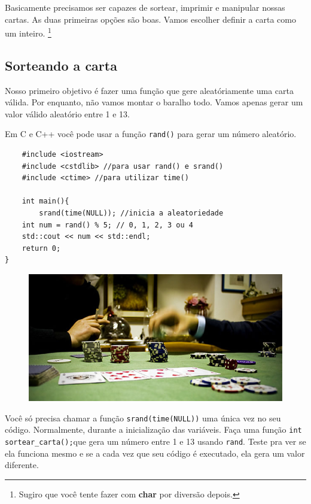 \documentclass[12pt]{article}
\newcommand{\code}[1]{\lstinline|#1|} %
\newcommand{\bold}[1]{\textbf{#1}} %
\begin{document}
Basicamente precisamos ser capazes de sortear, imprimir e manipular nossas
cartas.  As duas primeiras opções são boas. Vamos escolher definir a carta como
um inteiro.  \footnote{Sugiro que você tente fazer com \bold{char} por diversão
depois.}

\subsection{Sorteando a carta}

Nosso primeiro objetivo é fazer uma função que gere aleatóriamente uma carta
válida.  Por enquanto, não vamos montar o baralho todo. Vamos apenas gerar um
valor válido aleatório entre 1 e 13.

Em C e C++ você pode usar a função \code{rand()} para gerar um número aleatório.

\begin{mdframed}[nobreak=true]
	\begin{lstlisting}
	#include <iostream>
	#include <cstdlib> //para usar rand() e srand()
	#include <ctime> //para utilizar time()

	int main(){
		srand(time(NULL)); //inicia a aleatoriedade
	int num = rand() % 5; // 0, 1, 2, 3 ou 4
	std::cout << num << std::endl;
	return 0;
}
	\end{lstlisting}
\end{mdframed}

\begin{figure}[h]
	\centering
	\includegraphics{imagens/mesa}
\end{figure}

Você só precisa chamar a função \code{srand(time(NULL))} uma única vez no seu
código. Normalmente, durante a inicialização das variáveis. Faça uma função
\code{int sortear_carta();}que gera um número entre 1 e 13 usando \code{rand}.
Teste pra ver se ela funciona mesmo e se a cada vez que seu código é executado,
ela gera um valor diferente.
\end{document}
